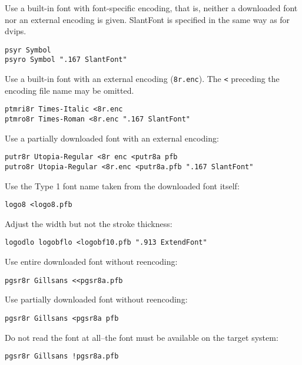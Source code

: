  

Use a built-in font with font-specific encoding, that is, neither a downloaded font 
nor an external encoding is given. SlantFont is specified in the same way as for 
dvips. 

\begin{verbatim}
psyr Symbol 
psyro Symbol ".167 SlantFont" 
\end{verbatim}

Use a built-in font with an external encoding (\verb|8r.enc|). The \verb|<| preceding the 
encoding file name may be omitted. 

\begin{verbatim}
ptmri8r Times-Italic <8r.enc 
ptmro8r Times-Roman <8r.enc ".167 SlantFont" 
\end{verbatim}

Use a partially downloaded font with an external encoding: 

\begin{verbatim}
putr8r Utopia-Regular <8r enc <putr8a pfb 
putro8r Utopia-Regular <8r.enc <putr8a.pfb ".167 SlantFont" 
\end{verbatim}

Use the Type 1 font name taken from the downloaded font itself: 

\begin{verbatim}
logo8 <logo8.pfb 
\end{verbatim}

Adjust the width but not the stroke thickness: 

\begin{verbatim}
logodlo logobflo <logobf10.pfb ".913 ExtendFont" 
\end{verbatim}

 
Use entire downloaded font without reencoding: 
\begin{verbatim}
pgsr8r Gillsans <<pgsr8a.pfb 
\end{verbatim}

Use partially downloaded font without reencoding: 

\begin{verbatim}
pgsr8r Gillsans <pgsr8a pfb 
\end{verbatim}

Do not read the font at all--the font must be available on the target system: 

\begin{verbatim}
pgsr8r Gillsans !pgsr8a.pfb 
\end{verbatim}

